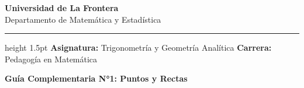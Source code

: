 \documentclass[12pt,a4paper]{article}
\begin{document}
\begin{center}
    {\bf\Large Universidad de La Frontera}\\[2pt]
    {\small Departamento de Matemática y Estadística}\\[4pt]
    \hrule height 1.5pt
    \vspace{0.3cm}
    {\small\textbf{Asignatura:} Trigonometría y Geometría Analítica \hfill \textbf{Carrera:} Pedagogía en Matemática}
\end{center}

\vspace{0.2cm}
\begin{center}
    {\Large\bfseries Guía Complementaria N°1: Puntos y Rectas}
\end{center}
\vspace{0.3cm}

\sffamily\small
\end{document}
